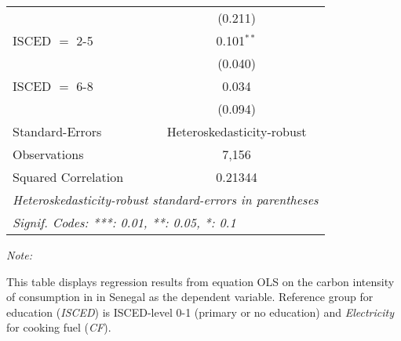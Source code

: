\begin{table}[htbp!]
\begin{adjustbox}{width = 1\textwidth, max height = 0.95\textheight, center}
\begin{threeparttable}[b]
\begin{tabular}{lc}
                                & (0.211)\\   
            ISCED $=$ 2-5       & 0.101$^{**}$\\   
                                & (0.040)\\   
            ISCED $=$ 6-8       & 0.034\\   
                                & (0.094)\\   
            \midrule 
            Standard-Errors     & Heteroskedasticity-robust \\   
            Observations        & 7,156\\  
            Squared Correlation & 0.21344\\  
            \midrule \midrule
            \multicolumn{2}{l}{\emph{Heteroskedasticity-robust standard-errors in parentheses}}\\
            \multicolumn{2}{l}{\emph{Signif. Codes: ***: 0.01, **: 0.05, *: 0.1}}\\
         \end{tabular}
         
         \begin{tablenotes}\item \medskip \textit{Note:}
            \item This table displays regression results from equation OLS on the carbon intensity of consumption in  in Senegal as the dependent variable. Reference group for education (\textit{ISCED}) is ISCED-level 0-1 (primary or no education) and \textit{Electricity} for cooking fuel (\textit{CF}).
         \end{tablenotes}
      \end{threeparttable}
   \end{adjustbox}
\end{table}


